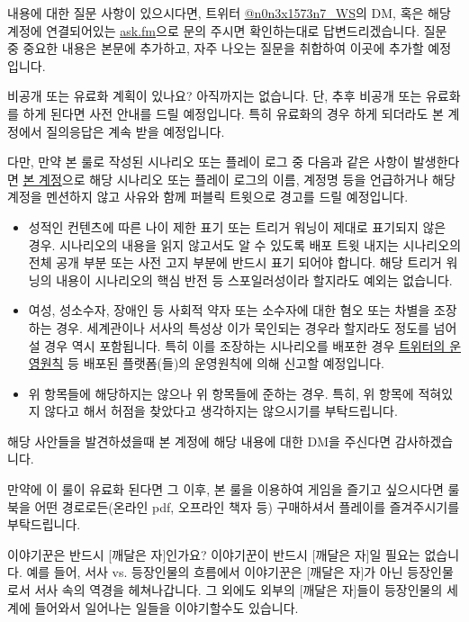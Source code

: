 \documentclass{report}
\begin{document}
	내용에 대한 질문 사항이 있으시다면, 트위터 \href{https://www.twitter.com/n0n3x1573n7_WS}{@n0n3x1573n7\_WS}의 DM, 혹은 해당 계정에 연결되어있는 \href{https://ask.fm/n0n3x1573n7_WS}{ask.fm}으로 문의 주시면 확인하는대로 답변드리겠습니다. 질문 중 중요한 내용은 본문에 추가하고, 자주 나오는 질문을 취합하여 이곳에 추가할 예정입니다.
	
	\bigskip
	
	\begin{faq}{비공개 또는 유료화 계획이 있나요?}
		아직까지는 없습니다. 단, 추후 비공개 또는 유료화를 하게 된다면 사전 안내를 드릴 예정입니다. 특히 유료화의 경우 하게 되더라도 본 계정에서 질의응답은 계속 받을 예정입니다.
		
		다만, 만약 본 룰로 작성된 시나리오 또는 플레이 로그 중 다음과 같은 사항이 발생한다면 \href{https://twitter.com/n0n3x1573n7_WS}{본 계정}으로 해당 시나리오 또는 플레이 로그의 이름, 계정명 등을 언급하거나 해당 계정을 멘션하지 않고 사유와 함께 퍼블릭 트윗으로 경고를 드릴 예정입니다.
		\begin{itemize}
			\item 성적인 컨텐츠에 따른 나이 제한 표기 또는 트리거 워닝이 제대로 표기되지 않은 경우. 시나리오의 내용을 읽지 않고서도 알 수 있도록 배포 트윗 내지는 시나리오의 전체 공개 부분 또는 사전 고지 부분에 반드시 표기 되어야 합니다. 해당 트리거 워닝의 내용이 시나리오의 핵심 반전 등 스포일러성이라 할지라도 예외는 없습니다.
			\item 여성, 성소수자, 장애인 등 사회적 약자 또는 소수자에 대한 혐오 또는 차별을 조장하는 경우. 세계관이나 서사의 특성상 이가 묵인되는 경우라 할지라도 정도를 넘어설 경우 역시 포함됩니다. 특히 이를 조장하는 시나리오를 배포한 경우 \href{https://help.twitter.com/ko/rules-and-policies/hateful-conduct-policy}{트위터의 운영원칙} 등 배포된 플랫폼(들)의 운영원칙에 의해 신고할 예정입니다.
			\item 위 항목들에 해당하지는 않으나 위 항목들에 준하는 경우. 특히, 위 항목에 적혀있지 않다고 해서 허점을 찾았다고 생각하지는 않으시기를 부탁드립니다.
		\end{itemize}
		해당 사안들을 발견하셨을때 본 계정에 해당 내용에 대한 DM을 주신다면 감사하겠습니다.
		
		만약에 이 룰이 유료화 된다면 그 이후, 본 룰을 이용하여 게임을 즐기고 싶으시다면 룰북을 어떤 경로로든(온라인 pdf, 오프라인 책자 등) 구매하셔서 플레이를 즐겨주시기를 부탁드립니다.
	\end{faq}
	
	\bigskip
	
	\begin{faq}{이야기꾼은 반드시 [깨달은 자]인가요?}
		이야기꾼이 반드시 [깨달은 자]일 필요는 없습니다. 예를 들어, 서사 vs. 등장인물의 흐름에서 이야기꾼은 [깨달은 자]가 아닌 등장인물로서 서사 속의 역경을 헤쳐나갑니다. 그 외에도 외부의 [깨달은 자]들이 등장인물의 세계에 들어와서 일어나는 일들을 이야기할수도 있습니다.
	\end{faq}
	
\end{document}
